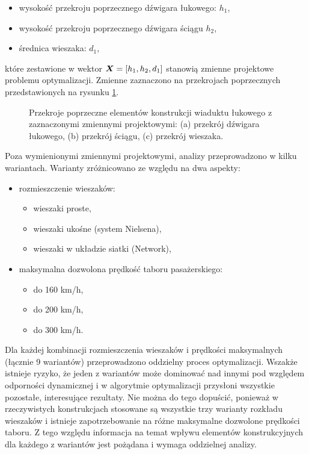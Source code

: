 \begin{itemize}
	\item wysokość przekroju poprzecznego dźwigara łukowego: $h_1$,
	\item wysokość przekroju poprzecznego dźwigara ściągu $h_2$,
	\item średnica wieszaka: $d_1$,
\end{itemize}
które zestawione w wektor $\bm{X}=[h_1,h_2,d_1]$ stanowią zmienne projektowe problemu optymalizacji. Zmienne zaznaczono na przekrojach poprzecznych przedstawionych na rysunku \ref{fig:wk2_opti_cs_elements}.
\begin{figure}[hbt!]
	\centering
	 \quad
	 \quad
	\captionsetup{justification=centering}
	\caption{Przekroje poprzeczne elementów konstrukcji wiaduktu łukowego z zaznaczonymi zmiennymi projektowymi: (a) przekrój dźwigara łukowego, (b) przekrój ściągu, (c) przekrój wieszaka.}
	\label{fig:wk2_opti_cs_elements}
\end{figure}

Poza wymienionymi zmiennymi projektowymi, analizy przeprowadzono w kilku wariantach. Warianty zróżnicowano ze względu na dwa aspekty:
\begin{itemize}
	\item rozmieszczenie wieszaków: 
	\begin{itemize}
		\item wieszaki proste,
		\item wieszaki ukośne (system Nielsena), 
		\item wieszaki w układzie siatki (Network),
	\end{itemize}
\end{itemize}

\pagebreak[4]
\begin{itemize}
	\item maksymalna dozwolona prędkość taboru pasażerskiego:
	\begin{itemize}
		\item do 160 km/h, 
		\item do 200 km/h,
		\item do 300 km/h.
	\end{itemize} 
\end{itemize}

Dla każdej kombinacji rozmieszczenia wieszaków i prędkości maksymalnych (łącznie 9 wariantów) przeprowadzono oddzielny proces optymalizacji. Wszakże istnieje ryzyko, że jeden z wariantów może dominować nad innymi pod względem odporności dynamicznej i w algorytmie optymalizacji przysłoni wszystkie pozostałe, interesujące rezultaty. Nie można do tego dopuścić, ponieważ w rzeczywistych konstrukcjach stosowane są wszystkie trzy warianty rozkładu wieszaków i istnieje zapotrzebowanie na różne maksymalne dozwolone prędkości taboru. Z tego względu informacja na temat wpływu elementów konstrukcyjnych dla każdego z wariantów jest pożądana i wymaga oddzielnej analizy.

